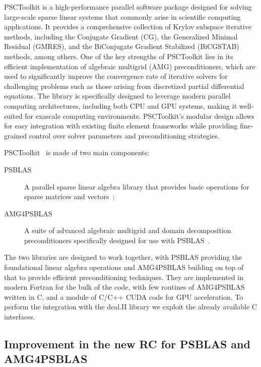 \documentclass[a4paper,12pt]{article}
\begin{document}
PSCToolkit is a high-performance parallel software package designed for solving large-scale sparse linear
systems that commonly arise in scientific computing applications. It provides a comprehensive collection
of Krylov subspace iterative methods, including the Conjugate Gradient (CG), the Generalized Minimal Residual (GMRES),
and the BiConjugate Gradient Stabilized (BiCGSTAB) methods, among others. One of the key strengths of PSCToolkit lies
in its efficient implementation of algebraic multigrid (AMG) preconditioners, which are used to significantly
improve the convergence rate of iterative solvers for challenging problems such as those arising from
discretized partial differential equations. The library is specifically designed to leverage modern
parallel computing architectures, including both CPU and GPU systems, making it well-suited for exascale
computing environments. PSCToolkit's modular design allows for easy integration with existing finite element
frameworks while providing fine-grained control over solver parameters and preconditioning strategies.

PSCToolkit~\cite{PSCToolkit} is made of two main components:
\begin{description}
    \item[PSBLAS] A parallel sparse linear algebra library that provides basic operations for sparse matrices and vectors~\cite{PSBLAS};
    \item[AMG4PSBLAS] A suite of advanced algebraic multigrid and domain decomposition preconditioners specifically
          designed for use with PSBLAS~\cite{AMG4PSBLAS}.
\end{description}
The two libraries are designed to work together, with PSBLAS providing the foundational linear algebra operations
and AMG4PSBLAS building on top of that to provide efficient preconditioning techniques.
They are implemented in modern Fortran for the bulk of the code, with few routines of AMG4PSBLAS written in C,
and a module of C/C++ CUDA code for GPU acceleration. To perform the integration with the deal.II library we
exploit the already available C interfaces.

\subsection{Improvement in the new RC for PSBLAS and AMG4PSBLAS}
\end{document}
